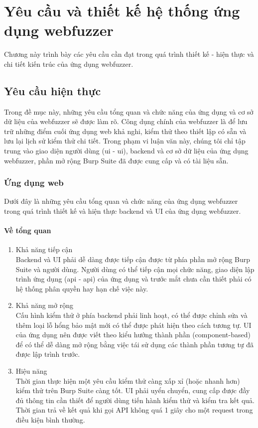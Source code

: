 \chapter{Yêu cầu và thiết kế hệ thống ứng dụng webfuzzer}
Chương này trình bày các yêu cầu cần đạt trong quá trình thiết kế - hiện thực và chi tiết kiến trúc của ứng dụng webfuzzer.
\section{Yêu cầu hiện thực}
Trong đề mục này, những yêu cầu tổng quan và chức năng của ứng dụng và cơ sở dữ liệu của webfuzzer sẽ được làm rõ. Công dụng chính của webfuzzer là để lưu trữ những điểm cuối ứng dụng web khả nghi, kiểm thử theo thiết lập có sẵn và lưu lại lịch sử kiểm thử chi tiết. Trong phạm vi luận văn này, chúng tôi chỉ tập trung vào giao diện người dùng (\acrfull{ui} - \acrshort{ui}), backend và cơ sở dữ liệu của ứng dụng webfuzzer, phần mở rộng Burp Suite đã được cung cấp và có tài liệu sẵn.
\subsection{Ứng dụng web}
Dưới đây là những yêu cầu tổng quan và chức năng của ứng dụng webfuzzer trong quá trình thiết kế và hiện thực backend và UI của ứng dụng webfuzzer.
\subsubsection{Về tổng quan}
\begin{enumerate}
    \item Khả năng tiếp cận\\
    Backend và UI phải dễ dàng được tiếp cận được từ phía phần mở rộng Burp Suite và người dùng. Người dùng có thể tiếp cận mọi chức năng, giao diện lập trình ứng dụng (\acrlong{api} - \acrshort{api}) của ứng dụng và trước mắt chưa cần thiết phải có hệ thống phân quyền hay hạn chế việc này.
    \item Khả năng mở rộng\\
    Cấu hình kiểm thử ở phía backend phải linh hoạt, có thể được chỉnh sửa và thêm loại lỗ hổng bảo mật mới có thể được phát hiện theo cách tương tự. UI của ứng dụng nên được viết theo kiểu hướng thành phần (component-based) để có thể dễ dàng mở rộng bằng việc tái sử dụng các thành phần tương tự đã được lập trình trước.
    \item Hiệu năng\\
    Thời gian thực hiện một yêu cầu kiểm thử càng xấp xỉ (hoặc nhanh hơn) kiểm thử trên Burp Suite càng tốt. UI phải uyển chuyển, cung cấp được đầy đủ thông tin cần thiết để người dùng tiến hành kiểm thử và kiểm tra kết quả. Thời gian trả về kết quả khi gọi API không quá 1 giây cho một request trong điều kiện bình thường.
\end{enumerate}
